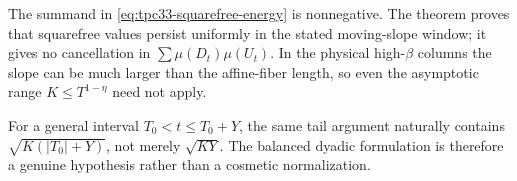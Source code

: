 \begin{remark}
\label{rem:tpc33-squarefree-not-signed}
The summand in \eqref{eq:tpc33-squarefree-energy} is nonnegative.  The
theorem proves that squarefree values persist uniformly in the stated
moving-slope window; it gives no cancellation in
\(\sum\mu(D_t)\mu(U_t)\).  In the physical high-\(\beta\) columns the slope
can be much larger than the affine-fiber length, so even the asymptotic
range \(K\le T^{1-\eta}\) need not apply.
\end{remark}

\begin{remark}
For a general interval \(T_0<t\le T_0+Y\), the same tail argument naturally
contains
\(\sqrt{K(|T_0|+Y)}\), not merely \(\sqrt{KY}\).  The balanced dyadic
formulation is therefore a genuine hypothesis rather than a cosmetic
normalization.
\end{remark}
